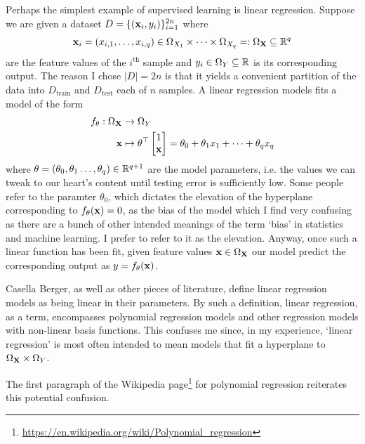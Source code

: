 \documentclass[11pt]{article}
\begin{document}
Perhaps the simplest example of supervised learning is linear regression. Suppose we are given a dataset $D=\{(\mathbf{x}_i,y_i)\}_{i=1}^{2n}$ where
$$
\mathbf{x}_i=(x_{i,1},\dots,x_{i, q})\in \Omega_{X_1}\times\dots\times \Omega_{X_q}=:\Omega_{\mathbf{X}}\subseteq\mathbb{R}^q
$$
are the feature values of the $i^{\text{th}}$ sample and $y_i\in \Omega_{Y}\subseteq\mathbb{R}$ is its corresponding output. The reason I chose $|D|=2n$ is that it yields a convenient partition of the data into $D_{\text{train}}$ and $D_{\text{test}}$ each of $n$ samples. A linear regression models fits a model of the form
\begin{align*}
    f_{\theta}:\Omega_{\mathbf{X}}&\rightarrow \Omega_Y\\
    \mathbf{x}&\mapsto
    \theta^{\top}
    \begin{bmatrix}
        1\\
        \mathbf{x}
    \end{bmatrix}
    =
    \theta_0+\theta_1x_1+\dots+\theta_qx_q    
\end{align*}
where $\theta=(\theta_0,\theta_1\dots,\theta_q)\in\mathbb{R}^{q+1}$ are the model parameters, i.e. the values we can tweak to our heart's content until testing error is sufficiently low. Some people refer to the paramter $\theta_0$, which dictates the elevation of the hyperplane corresponding to $f_{\theta}(\mathbf{x})=0$, as the bias of the model which I find very confusing as there are a bunch of other intended meanings of the term `bias' in statistics and machine learning. I prefer to refer to it as the elevation. Anyway, once such a linear function has been fit, given feature values $\mathbf{x}\in\Omega_{\mathbf{X}}$ our model predict the corresponding output as $y=f_{\theta}(\mathbf{x})$.

\begin{tcolorbox}[title={\centering\textbf{What does the `linear' in linear regression actually refer to?}}, colback=myLightBlue, colbacktitle=myDarkBlue, colframe=myDarkBlue, coltitle=white]
    Casella Berger, as well as other pieces of literature, define linear regression models as being linear in their parameters. By such a definition, linear regression, as a term, encompasses polynomial regression models and other regression models with non-linear basis functions. This confuses me since, in my experience, `linear regression' is most often intended to mean models that fit a hyperplane to $\Omega_{\mathbf{X}}\times\Omega_Y$.
    
    \hspace{14.52pt} The first paragraph of the Wikipedia page\footnote{\url{https://en.wikipedia.org/wiki/Polynomial_regression}} for polynomial regression reiterates this potential confusion.
\end{tcolorbox}
\end{document}
